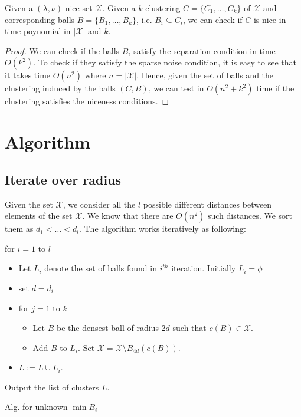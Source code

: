 \documentclass[11pt]{article}
\newenvironment{alg}{
    \begin{list}{}{
        \setlength{\itemsep}{2pt}
        \setlength{\parsep}{0pt}
        \setlength{\parskip}{0pt}
        \setlength{\topsep}{1pt}
    }
}
{
    \end{list}
}
\begin{document}
\begin{lemma}
\label{lemma:chknice}
Given a $(\lambda,\nu)$-nice set $\mathcal{X}$. Given a $k$-clustering $C = \{C_1,\ldots,C_k\}$ of $\mathcal{X}$ and corresponding balls $B = \{B_1,\ldots,B_k\}$, i.e. $B_i \subseteq C_i$, we can check if $C$ is nice in time poynomial in $|\mathcal{X}|$ and $k$.
\end{lemma}
\begin{proof}
We can check if the balls $B_i$ satisfy the separation condition in time $O(k^2)$. To check if they satisfy the sparse noise condition, it is easy to see that it takes time $O(n^2)$ where $n = |\mathcal{X}|$. Hence, given the set of balls and the clustering induced by the balls $(C,B)$, we can test in $O(n^2+k^2)$ time if the clustering satisfies the niceness conditions.
\end{proof}

\section{Algorithm}

\subsection{Iterate over radius}

Given the set $\mathcal{X}$,
we consider all the $l$ possible different distances between elements of the set $\mathcal{X}$. We know that there are $O(n^2)$ such distances. We sort them as $d_1<\ldots<d_l$. The algorithm works iteratively as following:


\begin{algorithm}
\begin{alg}
\item[] for $i=1$ to $l$
\begin{itemize}
	\item[] Let $L_i$ denote the set of balls found in $i^{th}$ iteration. Initially $L_i=\phi$
	\item[] set $d=d_i$
	\item[] for $j=1$ to $k$
	\begin{itemize}
		\item[] Let $B$ be the densest ball of radius $2d$ such that $c(B) \in \mathcal{X}$.
		\item[] Add $B$ to $L_i$. Set $\mathcal{X}=\mathcal{X}\setminus B_{4d}(c(B))$. 
	\end{itemize}
	\item[] $L := L \cup L_i$.
\end{itemize}
Output the list of clusters $L$.
\label{alg:NotKnown}
\end{alg}
\caption{Alg. for unknown $\min{B_i}$}
\end{algorithm}
\end{document}
